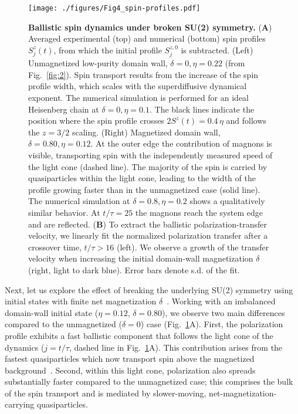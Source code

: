 \documentclass[
 reprint,
 superscriptaddress,
 amsmath,amssymb,
 aps,
 pra,
]{revtex4-2}
\begin{document}

\begin{figure}
    \centering
    \texttt{[image: ./figures/Fig4\_spin-profiles.pdf]}
    \caption{\textbf{Ballistic spin dynamics under broken SU(2) symmetry.}
        (\textbf{A}) Averaged experimental (top) and numerical (bottom) spin profiles $S_j^z (t)$, from which the initial profile $S_j^{z,0}$ is subtracted.
        (Left) Unmagnetized low-purity domain wall, $\delta = 0, \eta = 0.22$ (from Fig.~\ref{fig:2}). Spin transport results from the increase of the spin profile width, which scales with the superdiffusive dynamical exponent. The numerical simulation is performed for an ideal Heisenberg chain at $\delta = 0, \eta = 0.1$. The black lines indicate the position where the spin profile crosses $2 S^z(t) = 0.4\,\eta$ and follows the $z = 3/2$ scaling.
        (Right) Magnetized domain wall, $\delta = 0.80, \eta = 0.12$. At the outer edge the contribution of magnons is visible, transporting spin with the independently measured speed of the light cone (dashed line). The majority of the spin is carried by quasiparticles within the light cone, leading to the width of the profile growing faster than in the unmagnetized case (solid line).
        The numerical simulation at $\delta = 0.8, \eta = 0.2$ shows a qualitatively similar behavior. At $t/\tau = 25$ the magnons reach the system edge and are reflected.
        (\textbf{B}) To extract the ballistic polarization-transfer velocity, we linearly fit the normalized polarization transfer after a crossover time, $t/\tau > 16$ (left). We observe a growth of the transfer velocity when increasing the initial domain-wall magnetization $\delta$ (right, light to dark blue).
        Error bars denote s.d. of the fit.
    }
    \label{fig:4}
\end{figure}

Next, let us explore the effect of breaking the underlying SU(2) symmetry using initial states with finite net magnetization $\delta$~\cite{SI}.
%
Working with an imbalanced domain-wall initial state ($\eta=0.12$, $\delta=0.80$), we observe two main differences compared to the unmagnetized ($\delta = 0$) case (Fig.~\ref{fig:4}A).
%
First, the polarization profile exhibits a fast ballistic component that follows the light cone of the dynamics ($j = t/\tau$, dashed line in Fig.~\ref{fig:4}A).
%
This contribution arises from the fastest quasiparticles which now transport spin above the magnetized background~\cite{Weiner2020}.
%
Second, within this light cone, polarization also spreads substantially faster compared to the unmagnetized case;
this comprises the bulk of the spin transport and is mediated by slower-moving, net-magnetization-carrying quasiparticles.
\end{document}
